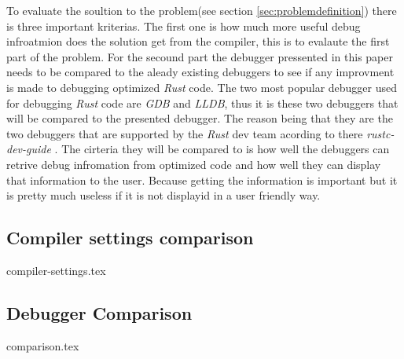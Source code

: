 

To evaluate the soultion to the problem(see section \ref{sec:problemdefinition}) there is three important kriterias.
The first one is how much more useful debug infroatmion does the solution get from the compiler, this is to evalaute the first part of the problem. 
For the secound part the debugger pressented in this paper needs to be compared to the aleady existing debuggers to see if any improvment is made to debugging optimized \emph{Rust} code.
The two most popular debugger used for debugging \emph{Rust} code are \emph{GDB} and \emph{LLDB}, thus it is these two debuggers that will be compared to the presented debugger.
The reason being that they are the two debuggers that are supported by the \emph{Rust} dev team acording to there \emph{rustc-dev-guide} \cite{rust-dev-guide}.
The cirteria they will be compared to is how well the debuggers can retrive debug infromation from optimized code and how well they can display that information to the user.
Because getting the information is important but it is pretty much useless if it is not displayid in a user friendly way.


\subsection{Compiler settings comparison}
{compiler-settings.tex}


\subsection{Debugger Comparison}
{comparison.tex}

